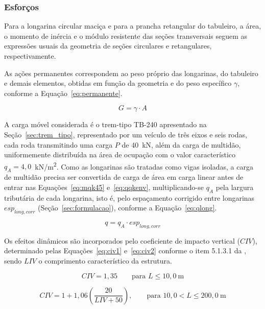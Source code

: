 \subsubsection{Esforços}

Para a longarina circular maciça e para a prancha retangular do tabuleiro, a área, o momento de inércia e o módulo resistente das seções transversais seguem as expressões usuais da geometria de seções circulares e retangulares, respectivamente.

As ações permanentes correspondem ao peso próprio das longarinas, do tabuleiro e demais elementos, obtidas em função da geometria e do peso específico $\gamma$, conforme a Equação~\eqref{eq:permanente}.

\begin{equation}
G = \gamma \cdot A
\label{eq:permanente}
\end{equation}

A carga móvel considerada é o trem-tipo TB-240 apresentado na Seção~\ref{sec:trem_tipo}, representado por um veículo de três eixos e seis rodas, cada roda transmitindo uma carga $P$ de 40~kN, além da carga de multidão, uniformemente distribuída na área de ocupação com o valor característico $q_A = 4{,}0$~kN/m\textsuperscript{2}.
Como as longarinas são tratadas como vigas isoladas, a carga de multidão precisa ser convertida de carga de área em carga linear antes de entrar nas Equações~\eqref{eq:mqk45} e~\eqref{eq:qqkenv}, multiplicando-se $q_A$ pela largura tributária de cada longarina, isto é, pelo espaçamento corrigido entre longarinas $esp_{long,corr}$ (Seção~\ref{sec:formulacao}), conforme a Equação~\eqref{eq:qlong}.

\begin{equation}
q = q_A \cdot esp_{long,corr}
\label{eq:qlong}
\end{equation}

Os efeitos dinâmicos são incorporados pelo coeficiente de impacto vertical ($CIV$), determinado pelas Equações~\eqref{eq:civ1} e~\eqref{eq:civ2} conforme o item 5.1.3.1 da \textcite{nbr7188}, sendo $LIV$ o comprimento característico da estrutura.

\begin{equation}
CIV = 1{,}35 \qquad \text{para } L \leq 10{,}0\ \text{m}
\label{eq:civ1}
\end{equation}

\begin{equation}
CIV = 1 + 1{,}06\left(\frac{20}{LIV + 50}\right), \qquad \text{para } 10{,}0 < L \leq 200{,}0\ \text{m}
\label{eq:civ2}
\end{equation}

